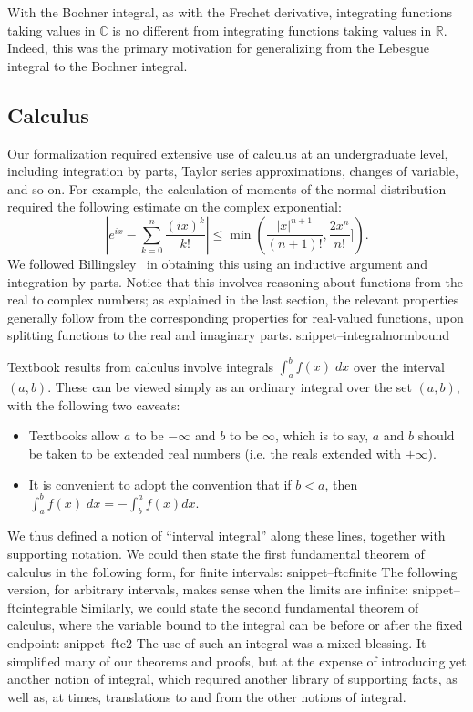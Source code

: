 \documentclass{svjour3}
\newcommand{\RR}{\mathbb{R}}
\newcommand{\CC}{\mathbb{C}}
\newcommand{\Snippet}[1]{\csname snippet--#1\endcsname}
\begin{document}
With the Bochner integral, as with the Frechet derivative, integrating functions taking values in $\CC$ is no different from integrating functions taking values in $\RR$. Indeed, this was the primary motivation for generalizing from the Lebesgue integral to the Bochner integral.

\subsection{Calculus}
\label{subsection:calculus}

Our formalization required extensive use of calculus at an undergraduate level, including integration by parts, Taylor series approximations, changes of variable, and so on. For example, the calculation of moments of the normal distribution required the following estimate on the complex exponential:
\[
 \left| e^{ix} - \sum_{k=0}^n \frac{(ix)^k}{k!} \right| \le \min\left(\frac{|x|^{n+1}}{(n+1)!}, \frac{2 x^n}{n!}]\right).
\]
We followed Billingsley~\cite[Section 26]{billingsley:95} in obtaining this using an inductive argument and integration by parts. Notice that this involves reasoning about functions from the real to complex numbers; as explained in the last section, the relevant properties generally follow from the corresponding properties for real-valued functions, upon splitting functions to the real and imaginary parts. 
\Snippet{integralnormbound}

Textbook results from calculus involve integrals $\int_a^b f(x) \; dx$ over the interval $(a,b)$. These can be viewed simply as an ordinary integral over the set $(a,b)$, with the following two caveats:
\begin{itemize}
 \item Textbooks allow $a$ to be $-\infty$ and $b$ to be $\infty$, which is to say, $a$ and $b$ should be taken to be extended real numbers (i.e. the reals extended with $\pm\infty$).
 \item It is convenient to adopt the convention that if $b < a$, then \\ $\int_a^b f(x) \; dx = -\int_b^a f(x) dx$.
\end{itemize}
We thus defined a notion of ``interval integral'' along these lines, together with supporting notation. We could then state the first fundamental theorem of calculus in the following form, for finite intervals:
\Snippet{ftcfinite}
The following version, for arbitrary intervals, makes sense when the limits are infinite:
\Snippet{ftcintegrable}
Similarly, we could state the second fundamental theorem of calculus, where the variable bound to the integral can be before or after the fixed endpoint:
\Snippet{ftc2}
The use of such an integral was a mixed blessing. It simplified many of our theorems and proofs, but at the expense of introducing yet another notion of integral, which required another library of supporting facts, as well as, at times, translations to and from the other notions of integral.
\end{document}
